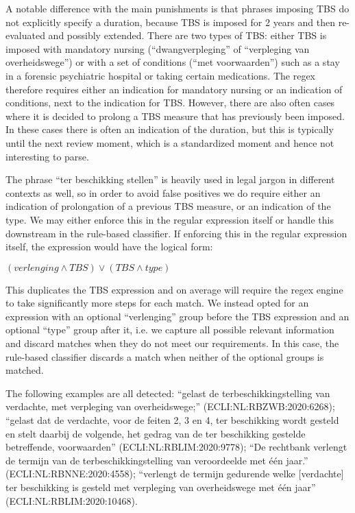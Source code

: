 \documentclass[a4paper]{article}
\begin{document}
A notable difference with the main punishments is that phrases imposing TBS do not explicitly specify a duration, because TBS is imposed for 2 years and then re-evaluated and possibly extended.
There are two types of TBS: either TBS is imposed with mandatory nursing (``dwangverpleging'' of ``verpleging van overheidswege'') or with a set of conditions (``met voorwaarden'') such as a stay in a forensic psychiatric hospital or taking certain medications. 
The regex therefore requires either an indication for mandatory nursing or an indication of conditions, next to the indication for TBS.
However, there are also often cases where it is decided to prolong a TBS measure that has previously been imposed.
In these cases there is often an indication of the duration, but this is typically until the next review moment, which is a standardized moment and hence not interesting to parse.

The phrase ``ter beschikking stellen'' is heavily used in legal jargon in different contexts as well, so in order to avoid false positives we do require either an indication of prolongation of a previous TBS measure, or an indication of the type.
We may either enforce this in the regular expression itself or handle this downstream in the rule-based classifier.
If enforcing this in the regular expression itself, the expression would have the logical form:

$(verlenging \land TBS) \lor (TBS \land type)$

This duplicates the TBS expression and on average will require the regex engine to take significantly more steps for each match.
We instead opted for an expression with an optional ``verlenging'' group before the TBS expression and an optional ``type'' group after it, i.e. we capture all possible relevant information and discard matches when they do not meet our requirements.
In this case, the rule-based classifier discards a match when neither of the optional groups is matched.

The following examples are all detected:
``gelast de terbeschikkingstelling van verdachte, met verpleging van overheidswege;'' (ECLI:NL:RBZWB:2020:6268);
``gelast dat de verdachte, voor de feiten 2, 3 en 4, ter beschikking wordt gesteld en stelt daarbij de volgende, het gedrag van de ter beschikking gestelde betreffende, voorwaarden'' (ECLI:NL:RBLIM:2020:9778);
``De rechtbank verlengt de termijn van de terbeschikkingstelling van veroordeelde met één jaar.'' (ECLI:NL:RBNNE:2020:4558);
``verlengt de termijn gedurende welke [verdachte] ter beschikking is gesteld met verpleging van overheidswege met één jaar'' (ECLI:NL:RBLIM:2020:10468).
\end{document}
